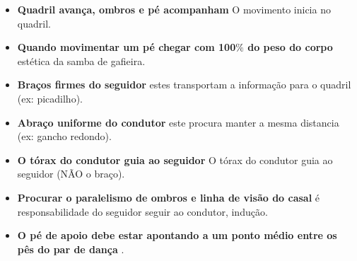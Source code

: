 \begin{itemize}
\item \textbf{Quadril avança, ombros e pé acompanham}  O movimento inicia no quadril.
\item \textbf{Quando movimentar um pé chegar com 100$\%$ do peso do corpo} estética da samba de gafieira.
\item \textbf{Braços firmes do seguidor} estes transportam a informação para o quadril (ex: picadilho).
\item \textbf{Abraço uniforme do condutor} este procura manter a mesma distancia (ex: gancho redondo).
\item \textbf{O tórax do condutor guia ao seguidor} O tórax do condutor guia ao seguidor (NÃO o braço).
\item \textbf{Procurar o paralelismo de ombros e linha de visão do casal} é responsabilidade do seguidor seguir ao condutor, indução.
\item \textbf{O pé de apoio debe estar apontando a um ponto médio entre os pês do par de dança} .
\end{itemize}
